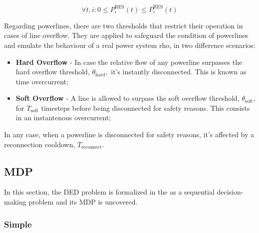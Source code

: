 \begin{equation} \label{eq:res-limits}
	\forall t, i: 0 \leq P^\text{RES}_i (t) \leq \overline{P^\text{RES}_i} (t)
\end{equation}

Regarding powerlines, there are two thresholds that restrict their operation in cases of line overflow. They are applied to safeguard the condition of powerlines and emulate the behaviour of a real power system $\text{rho}$, in two difference scenarios:
\begin{itemize}
	\item \textbf{Hard Overflow} - In case the relative flow of any powerline surpasses the hard overflow threshold, $\theta_\text{hard},$ it's instantly disconnected. This is known as time overcurrent;
	\item \textbf{Soft Overflow} - A line is allowed to surpass the soft overflow threshold, $\theta_\text{soft}$, for $T_\text{soft}$ timesteps before being disconnected for safety reasons. This consists in an instantenous overcurrent;
\end{itemize}
In any case, when a powerline is disconnected for safety reasons, it's affected by a reconnection cooldown, $T_\text{reconnect}$.

\subsection{\acf{MDP}}

In this section, the \ac{DED} problem is formalized in the as a sequential decision-making problem and its \ac{MDP} is uncovered. 

\subsubsection{Simple}

